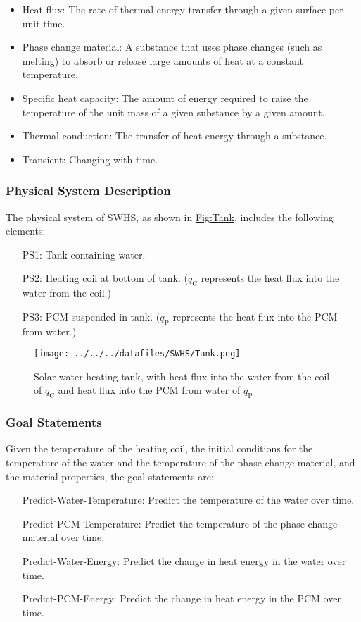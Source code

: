 \documentclass[12pt]{article}
\begin{document}
\begin{itemize}
\item{Heat flux: The rate of thermal energy transfer through a given surface per unit time.}
\item{Phase change material: A substance that uses phase changes (such as melting) to absorb or release large amounts of heat at a constant temperature.}
\item{Specific heat capacity: The amount of energy required to raise the temperature of the unit mass of a given substance by a given amount.}
\item{Thermal conduction: The transfer of heat energy through a substance.}
\item{Transient: Changing with time.}
\end{itemize}
\subsubsection{Physical System Description}
\label{Sec:PhysSyst}
The physical system of SWHS, as shown in \hyperref[Figure:Tank]{Fig:Tank}, includes the following elements:

\begin{itemize}
\item[PS1:]{Tank containing water.}
\item[PS2:]{Heating coil at bottom of tank. (${q_{\text{C}}}$ represents the heat flux into the water from the coil.)}
\item[PS3:]{PCM suspended in tank. (${q_{\text{P}}}$ represents the heat flux into the PCM from water.)}
\end{itemize}
\begin{figure}
\begin{center}
\texttt{[image: ../../../datafiles/SWHS/Tank.png]}
\caption{Solar water heating tank, with heat flux into the water from the coil of ${q_{\text{C}}}$ and heat flux into the PCM from water of ${q_{\text{P}}}$}
\label{Figure:Tank}
\end{center}
\end{figure}
\subsubsection{Goal Statements}
\label{Sec:GoalStmt}
Given the temperature of the heating coil, the initial conditions for the temperature of the water and the temperature of the phase change material, and the material properties, the goal statements are:

\begin{itemize}
\item[Predict-Water-Temperature:\phantomsection\label{waterTempGS}]{Predict the temperature of the water over time.}
\item[Predict-PCM-Temperature:\phantomsection\label{pcmTempGS}]{Predict the temperature of the phase change material over time.}
\item[Predict-Water-Energy:\phantomsection\label{waterEnergyGS}]{Predict the change in heat energy in the water over time.}
\item[Predict-PCM-Energy:\phantomsection\label{pcmEnergyGS}]{Predict the change in heat energy in the PCM over time.}
\end{itemize}
\end{document}

